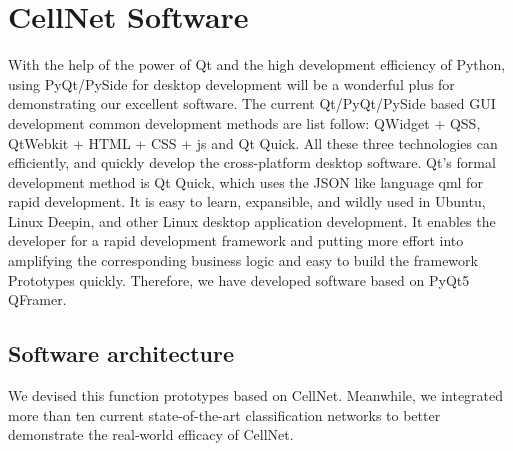 \section{CellNet Software}
\label{sec:ipsum}
With the help of the power of Qt and the high development efficiency of Python, using PyQt/PySide for desktop development will be a wonderful plus for demonstrating our excellent software.
The current Qt/PyQt/PySide based GUI development common development methods are list follow: QWidget + QSS, QtWebkit + HTML + CSS + js and Qt Quick. All these three technologies can efficiently,  and quickly develop the cross-platform desktop software. Qt's formal development method is Qt Quick, which uses the JSON like language qml for rapid development. It is easy to learn, expansible, and wildly used in  Ubuntu, Linux Deepin, and other Linux desktop application development. It enables the developer for a rapid development framework and putting more effort into amplifying the corresponding business logic and easy to build the framework Prototypes quickly. Therefore, we have developed software based on PyQt5 QFramer.

\subsection{Software architecture} %
\label{sub:dolor_sit}
We devised this function prototypes based on CellNet. Meanwhile, we integrated more than ten current state-of-the-art classification networks to better demonstrate the real-world efficacy of CellNet.

